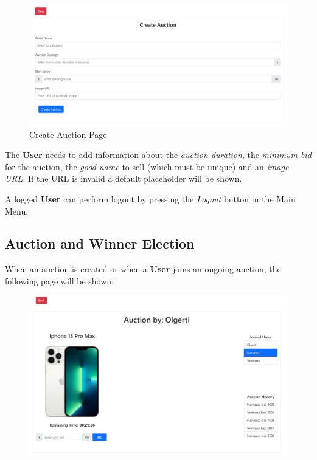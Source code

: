\begin{figure}[H]
	\centering
	\includegraphics[width=1\linewidth]{img/create_auction}
	\caption{Create Auction Page}
	\label{fig:createauction}
\end{figure}

The \textbf{User} needs to add information about the \textit{auction duration}, the \textit{minimum bid} for the auction, the \textit{good name} to sell (which must be unique) and an \textit{image URL}. If the URL is invalid a default placeholder will be shown.

A logged \textbf{User} can perform logout by pressing the \textit{Logout} button in the Main Menu.

\subsection{Auction and Winner Election}

When an auction is created or when a \textbf{User} joins an ongoing auction, the following page will be shown:

\begin{figure}[H]
	\centering
	\includegraphics[width=1\linewidth]{img/auction}
	\caption{}
	\label{fig:auction}
\end{figure}


